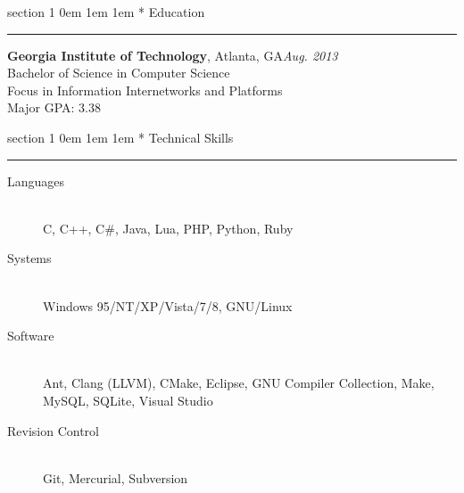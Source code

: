 \documentclass{article}
\makeatletter
\newcommand{\name}[1]{\def \@name {#1}}
\newcommand{\streetaddress}[1]{\def \@streetaddress {#1}}
\newcommand{\citystatezip}[1]{\def \@citystatezip {#1}}
\newcommand{\phone}[1]{\def \@phone {#1}}
\newcommand{\email}[1]{\def \@email {#1}}
\newcommand{\website}[1]{\def \@website {#1}}
\renewcommand{\section}[1]{
	\vspace{0.75em}
	\@startsection
	{section}
	{1}
	{\z@}
	{0em}
	{1em \@minus 1em} %
	{\normalfont\large\sc\bfseries}
	*
	{#1}
	\vspace{-0.75em} %
	\hrule
	\par
}
\newcommand{\entry}[1]{\def \@entry {#1}}
\newcommand{\dates}[1]{\def \@dates {#1}}
\newcommand{\location}[1]{\def \@location {#1}}
\newenvironment{locationentry}{
	\vspace{0.5em}
	{\bf \@entry}, \@location \hfill {\it \@dates} \\
}{}
\makeatother
\begin{document}
\name{Robert Kernan}
\phone{(770) 355-4050}
\streetaddress{16 Arbor Way Drive}
\citystatezip{Decatur, GA 30030}
\email{rkernan@gmail.com}
\website{robertkernan.com}

\maketitle

\thispagestyle{empty}


\section{Education}


\entry{Georgia Institute of Technology}
\location{Atlanta, GA}
\dates{Aug. 2013}
\begin{locationentry}
	Bachelor of Science in Computer Science \\
	Focus in Information Internetworks and Platforms \\
	Major GPA: 3.38 \\
\end{locationentry}

\section{Technical Skills}
\vspace{0.5em}
\begin{description}
	\item[Languages] \hfill \\
		C, C++, C\#, Java, Lua, PHP, Python, Ruby
	\item[Systems] \hfill \\
		Windows 95/NT/XP/Vista/7/8, GNU/Linux
	\item[Software] \hfill \\
		Ant, Clang (LLVM), CMake, Eclipse, GNU Compiler Collection, Make, MySQL,
		SQLite, Visual Studio
	\item[Revision Control] \hfill \\
		Git, Mercurial, Subversion
\end{description}
\end{document}
